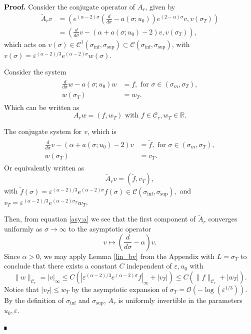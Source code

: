 \documentclass[letterpaper,11pt]{article}
\newcommand{\rmO}{\mathcal{O}}
\newcommand{\eps}{\varepsilon}
\numberwithin{equation}{section}
\theoremstyle{plain}
\newenvironment{Proof}[1][.]%
 {\begin{trivlist}\item[]\textbf{Proof#1 }}%
 {\hspace*{\fill}$\rule{0.3\baselineskip}{0.35\baselineskip}$\end{trivlist}}
\begin{document}
\begin{Proof}
Consider the conjugate operator of $A_r$, given by
\begin{align*}
\tilde{A}_r v &= \left( e^{(\alpha-2)\sigma}\left(\frac{d}{d\sigma}-a(\sigma;u_0)\right)e^{(2-\alpha)\sigma} v, v(\sigma_T) \right) \\
&= \left( \frac{d}{d\sigma}v -(\alpha+a(\sigma;u_0)-2)v, v(\sigma_T) \right),
\end{align*}
which acts on $v(\sigma) \in \mathcal{C}^1(\sigma_{\inf}, \sigma_{\sup}) \subset \mathcal{C}(\sigma_{\inf}, \sigma_{\sup})$, with $v(\sigma) = \eps^{(\alpha-2)/3}e^{(\alpha-2)\sigma}w(\sigma)$. 

Consider the system 
\begin{align*}
\begin{split}
\frac{d}{d\sigma} w - a(\sigma;u_0)w &= f, \text{ for } \sigma \in (\sigma_m, \sigma_T),\\
w(\sigma_T) &= w_T.
\end{split}
\end{align*}
Which can be written as 
\[
A_r w = (f,w_T) \text{ with } f \in \mathcal{C}_r, w_T \in \mathbb{R}.
\] 

The conjugate system for $v$, which is 
\begin{align*}
\begin{split}
\frac{d}{d\sigma}v -(\alpha+a(\sigma;u_0)-2)v &= \tilde{f}, \text{ for } \sigma \in (\sigma_m, \sigma_T),\\
w(\sigma_T) &= v_T.
\end{split}
\end{align*}
Or equivalently written as
\[
\tilde{A}_r v = (\tilde{f},v_T),
\]
with $\tilde{f}(\sigma) = \eps^{(\alpha-2)/3}e^{(\alpha-2)\sigma} f(\sigma) \in \mathcal{C}(\sigma_{\inf}, \sigma_{\sup}),$ and $v_T = \eps^{(\alpha-2)/3} e^{(\alpha-2)\sigma_T}w_T$.
 
Then, from equation \eqref{asy:a} we see that the first component of $\tilde{A}_r$ converges uniformly as $\sigma \to \infty$ to the asymptotic operator 
\[
v\mapsto \left(\frac{d}{d\sigma} -\alpha \right) v.
\] 
Since $\alpha>0$, we may apply Lemma \ref{lin_bv} from the Appendix with $L= \sigma_T$ to conclude that there exists a constant $C$ independent of $\eps, u_0$ with 
\begin{equation}\label{linear_est:r}
\|w\|_{\mathcal{C}_r} = |v|_\infty \le C(|\eps^{(\alpha-2)/3}e^{(\alpha-2)\sigma} f |_{\infty}+|v_T|) \le C(\|f\|_{\mathcal{C}_r}+|w_T|).
\end{equation}
Notice that $|v_T| \le w_T$ by the asymptotic expansion of $\sigma_T  = \rmO(-\log(\eps^{1/3}))$. By the definition of $\sigma_{\inf}$ and $\sigma_{\sup}$, $A_r$ is uniformly invertible in the parameters $u_0,\eps$.


\end{Proof}
\end{document}
